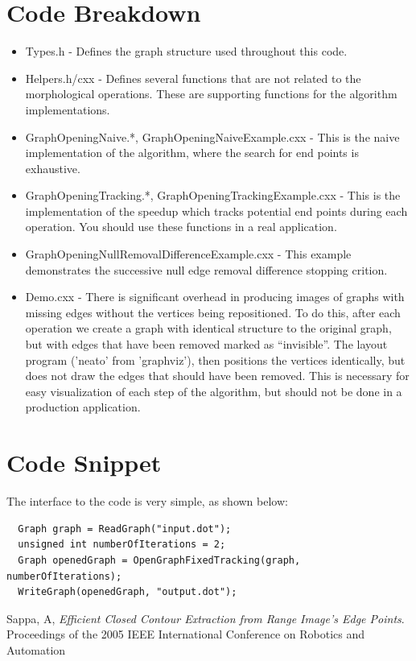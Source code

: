 \documentclass{ComputationalAlgorithmsArticle}
\begin{document}
\section{Code Breakdown}
\begin{itemize}
 \item Types.h - Defines the graph structure used throughout this code.
 \item Helpers.h/cxx - Defines several functions that are not related to the morphological operations. These are supporting functions for the algorithm implementations.
 \item GraphOpeningNaive.*, GraphOpeningNaiveExample.cxx - This is the naive implementation of the algorithm, where the search for end points is exhaustive.
 \item GraphOpeningTracking.*, GraphOpeningTrackingExample.cxx - This is the implementation of the speedup which tracks potential end points during each operation. You should use these functions in a real application.
 \item GraphOpeningNullRemovalDifferenceExample.cxx - This example demonstrates the successive null edge removal difference stopping crition.
 \item Demo.cxx - There is significant overhead in producing images of graphs with missing edges without the vertices being repositioned. To do this, after each operation we create a graph with identical structure to the original graph, but with edges that have been removed marked as ``invisible''. The layout program ('neato' from 'graphviz'), then positions the vertices identically, but does not draw the edges that should have been removed. This is necessary for easy visualization of each step of the algorithm, but should not be done in a production application.
\end{itemize}

\section{Code Snippet}
The interface to the code is very simple, as shown below:
\begin{verbatim}
  Graph graph = ReadGraph("input.dot");
  unsigned int numberOfIterations = 2;
  Graph openedGraph = OpenGraphFixedTracking(graph, numberOfIterations);
  WriteGraph(openedGraph, "output.dot");
\end{verbatim}


\begin{thebibliography}{9}

	  Sappa, A,
	  \emph{Efficient Closed Contour Extraction from Range Image's Edge Points}.
	  Proceedings of the 2005 IEEE International Conference on Robotics and Automation

\end{thebibliography}
\end{document}
